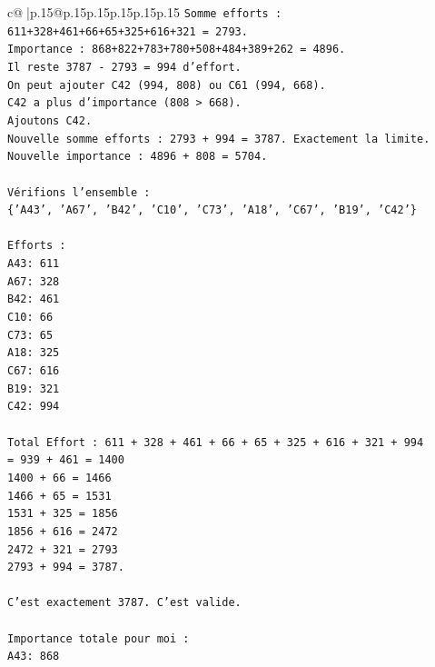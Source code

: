 \documentclass{article}
\begin{document}
{\begin{supertabular}{c@{$\;$}|p{.15\linewidth}@{}p{.15\linewidth}p{.15\linewidth}p{.15\linewidth}p{.15\linewidth}p{.15\linewidth}}
{{{\texttt{Somme efforts : 611+328+461+66+65+325+616+321 = 2793.} \\
\texttt{Importance : 868+822+783+780+508+484+389+262 = 4896.} \\
\texttt{Il reste 3787 {-} 2793 = 994 d'effort.} \\
\texttt{On peut ajouter C42 (994, 808) ou C61 (994, 668).} \\
\texttt{C42 a plus d'importance (808 > 668).} \\
\texttt{Ajoutons C42.} \\
\texttt{Nouvelle somme efforts : 2793 + 994 = 3787. Exactement la limite.} \\
\texttt{Nouvelle importance : 4896 + 808 = 5704.} \\
\\ 
\texttt{Vérifions l'ensemble :} \\
\texttt{\{'A43', 'A67', 'B42', 'C10', 'C73', 'A18', 'C67', 'B19', 'C42'\}} \\
\\ 
\texttt{Efforts :} \\
\texttt{A43: 611} \\
\texttt{A67: 328} \\
\texttt{B42: 461} \\
\texttt{C10: 66} \\
\texttt{C73: 65} \\
\texttt{A18: 325} \\
\texttt{C67: 616} \\
\texttt{B19: 321} \\
\texttt{C42: 994} \\
\\ 
\texttt{Total Effort : 611 + 328 + 461 + 66 + 65 + 325 + 616 + 321 + 994} \\
\texttt{= 939 + 461 = 1400} \\
\texttt{1400 + 66 = 1466} \\
\texttt{1466 + 65 = 1531} \\
\texttt{1531 + 325 = 1856} \\
\texttt{1856 + 616 = 2472} \\
\texttt{2472 + 321 = 2793} \\
\texttt{2793 + 994 = 3787.} \\
\\ 
\texttt{C'est exactement 3787. C'est valide.} \\
\\ 
\texttt{Importance totale pour moi :} \\
\texttt{A43: 868} \\
}}}
\end{supertabular}}
\end{document}
